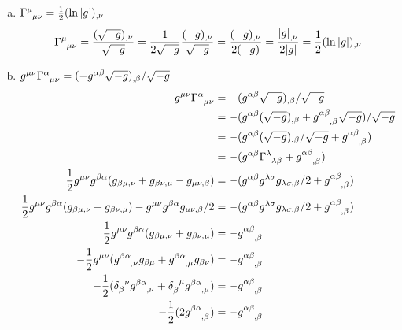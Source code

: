 \documentclass[gr-notes.tex]{subfiles}
\begin{document}
\begin{enumerate}[(a)]
\item $\tensor{\Gamma}{^\mu_{\mu\nu}} = \frac{1}{2} (\ln\abs{g})_{,\nu}$
%
\begin{displaymath}
  \tensor{\Gamma}{^\mu_{\mu\nu}} =
  \frac{(\sqrt{-g})_{,\nu}}{\sqrt{-g}} =
  \frac{1}{2 \sqrt{-g}} \frac{(-g)_{,\nu}}{\sqrt{-g}} =
  \frac{(-g)_{,\nu}}{2 (-g)} =
  \frac{\abs{g}_{,\nu}}{2 \abs{g}} =
  \frac{1}{2} (\ln\abs{g})_{,\nu}
\end{displaymath}
%
\item $g^{\mu\nu} \tensor{\Gamma}{^\alpha_{\mu\nu}} =
       (-g^{\alpha\beta} \sqrt{-g})_{,\beta} / \sqrt{-g}$
%
\begin{align*}
  g^{\mu\nu} \tensor{\Gamma}{^\alpha_{\mu\nu}} &=
 -(g^{\alpha\beta} \sqrt{-g})_{,\beta} / \sqrt{-g}
  \\ &=
 -(g^{\alpha\beta} (\sqrt{-g})_{,\beta} +
   \tensor{g}{^{\alpha\beta}_{,\beta}} \sqrt{-g}) / \sqrt{-g}
  \\ &=
  -(g^{\alpha\beta} (\sqrt{-g})_{,\beta} / \sqrt{-g} +
    \tensor{g}{^{\alpha\beta}_{,\beta}})
  \\ &=
  -(g^{\alpha\beta} \tensor{\Gamma}{^\lambda_{\lambda\beta}} +
    \tensor{g}{^{\alpha\beta}_{,\beta}})
  \\
  \frac{1}{2} g^{\mu\nu} g^{\beta\alpha}
  (g_{\beta\mu,\nu} + g_{\beta\nu,\mu} - g_{\mu\nu,\beta}) &=
  -(g^{\alpha\beta} g^{\lambda\sigma} g_{\lambda\sigma,\beta} / 2 +
    \tensor{g}{^{\alpha\beta}_{,\beta}})
  \\
  \frac{1}{2} g^{\mu\nu} g^{\beta\alpha}
  (g_{\beta\mu,\nu} + g_{\beta\nu,\mu}) -
  g^{\mu\nu} g^{\beta\alpha} g_{\mu\nu,\beta} / 2 &=
  -(g^{\alpha\beta} g^{\lambda\sigma} g_{\lambda\sigma,\beta} / 2 +
    \tensor{g}{^{\alpha\beta}_{,\beta}})
  \\
  \frac{1}{2} g^{\mu\nu} g^{\beta\alpha}
  (g_{\beta\mu,\nu} + g_{\beta\nu,\mu}) &=
 -\tensor{g}{^{\alpha\beta}_{,\beta}}
  \\
 -\frac{1}{2} g^{\mu\nu}
  (\tensor{g}{^{\beta\alpha}_{,\nu}} g_{\beta\mu} +
   \tensor{g}{^{\beta\alpha}_{,\mu}} g_{\beta\nu}) &=
 -\tensor{g}{^{\alpha\beta}_{,\beta}}
  \\
 -\frac{1}{2}
  (\tensor{\delta}{_\beta^\nu} \tensor{g}{^{\beta\alpha}_{,\nu}} +
   \tensor{\delta}{_\beta^\mu} \tensor{g}{^{\beta\alpha}_{,\mu}}) &=
 -\tensor{g}{^{\alpha\beta}_{,\beta}}
  \\
 -\frac{1}{2}
  (2 \tensor{g}{^{\beta\alpha}_{,\beta}}) &=
 -\tensor{g}{^{\alpha\beta}_{,\beta}}
\end{align*}

\end{enumerate}
\end{document}
